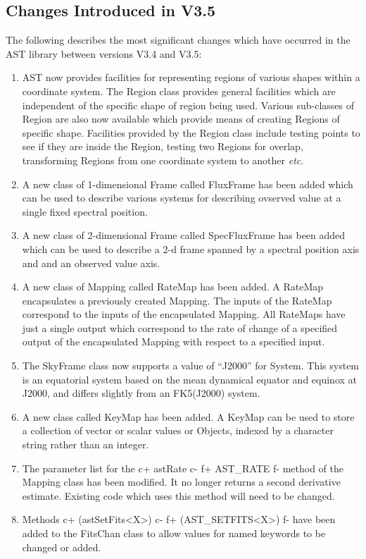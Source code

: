 \documentclass[twoside,11pt]{article}
\begin{document}
\subsection{Changes Introduced in V3.5}

The following describes the most significant changes which have
occurred in the AST library between versions V3.4 and V3.5:

\begin{enumerate}

\item AST now provides facilities for representing regions of various
shapes within a coordinate system. The Region class provides general
facilities which are independent of the specific shape of region being
used. Various sub-classes of Region are also now available which provide 
means of creating Regions of specific shape. Facilities provided by the
Region class include testing points to see if they are inside the
Region, testing two Regions for overlap, transforming Regions from one
coordinate system to another \emph{etc}.

\item A new class of 1-dimensional Frame called FluxFrame has been added which 
can be used to describe various systems for describing ovserved value at a 
single fixed spectral position. 

\item A new class of 2-dimensional Frame called SpecFluxFrame has been added which 
can be used to describe a 2-d frame spanned by a spectral position axis
and and an observed value axis.

\item A new class of Mapping called RateMap has been added. A RateMap encapsulates
a previously created Mapping. The inputs of the RateMap correspond to the
inputs of the encapsulated Mapping. All RateMaps have just a single
output which correspond to the rate of change of a specified output of
the encapsulated Mapping with respect to a specified input.

\item The SkyFrame class now supports a value of ``J2000'' for System.
This system is an equatorial system based on the mean dynamical equator and
equinox at J2000, and differs slightly from an FK5(J2000) system.

\item A new class called KeyMap has been added. A KeyMap can be used to
store a collection of vector or scalar values or Objects, indexed by a 
character string rather than an integer.

\item The parameter list for the 
c+
astRate 
c-
f+
AST\_RATE
f-
method of the Mapping class has been modified. It no longer returns a second 
derivative estimate. Existing code which uses this method will need to be 
changed.

\item Methods 
c+
(astSetFits<X>)
c-
f+
(AST\_SETFITS<X>)
f-
have been added to the FitsChan class to allow values for named
keywords to be changed or added.

\end{enumerate}
\end{document}
